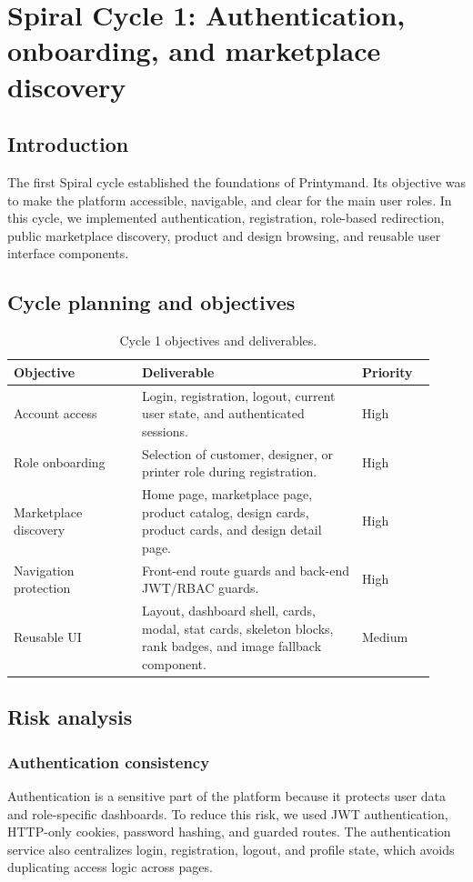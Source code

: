 \chapter{Spiral Cycle 1: Authentication, onboarding, and marketplace discovery}
\label{ch::chapter4}

\section{Introduction}
The first Spiral cycle established the foundations of Printymand.
Its objective was to make the platform accessible, navigable, and clear for the main user roles.
In this cycle, we implemented authentication, registration, role-based redirection, public marketplace discovery, product and design browsing, and reusable user interface components.

\section{Cycle planning and objectives}
\begin{table}[!htpb]
\caption{Cycle 1 objectives and deliverables.}
\centering
\begin{tabular}{|p{0.28\linewidth}|p{0.48\linewidth}|p{0.16\linewidth}|}
\hline
\textbf{Objective} & \textbf{Deliverable} & \textbf{Priority} \\ \hline
Account access & Login, registration, logout, current user state, and authenticated sessions. & High \\ \hline
Role onboarding & Selection of customer, designer, or printer role during registration. & High \\ \hline
Marketplace discovery & Home page, marketplace page, product catalog, design cards, product cards, and design detail page. & High \\ \hline
Navigation protection & Front-end route guards and back-end JWT/RBAC guards. & High \\ \hline
Reusable UI & Layout, dashboard shell, cards, modal, stat cards, skeleton blocks, rank badges, and image fallback component. & Medium \\ \hline
\end{tabular}
\label{tab:cycle1_objectives}
\end{table}

\section{Risk analysis}
\subsection{Authentication consistency}
Authentication is a sensitive part of the platform because it protects user data and role-specific dashboards.
To reduce this risk, we used JWT authentication, HTTP-only cookies, password hashing, and guarded routes.
The authentication service also centralizes login, registration, logout, and profile state, which avoids duplicating access logic across pages.

